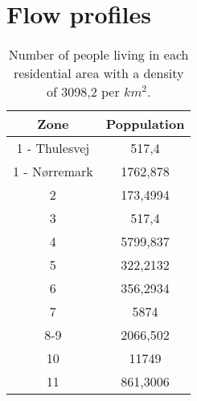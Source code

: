 \section{Flow profiles}\label{app:flow_profiles}



\begin{table}[]
\centering
\begin{tabular}{|c|c|}
\hline
\textbf{Zone} & \textbf{Poppulation} \\ \hline
1 - Thulesvej & 517,4                \\ \hline
1 - Nørremark & 1762,878             \\ \hline
2             & 173,4994             \\ \hline
3             & 517,4                \\ \hline
4             & 5799,837             \\ \hline
5             & 322,2132             \\ \hline
6             & 356,2934             \\ \hline
7             & 5874                 \\ \hline
8-9           & 2066,502             \\ \hline
10            & 11749                \\ \hline
11            & 861,3006             \\ \hline
\end{tabular}
\caption{Number of people living in each residential area with a density of 3098,2 per $km^2$.}
\label{tab:population_in_the_residential_area}
\end{table}